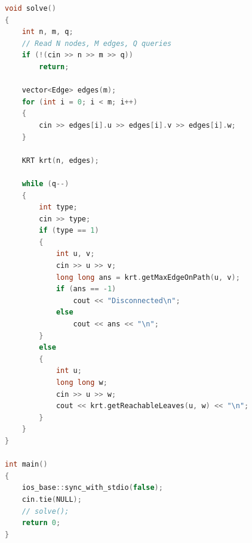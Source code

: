 \documentclass[10pt,landscape,a4paper,twocolumn]{article}
\begin{document}
\begin{lstlisting}[language=C++]
void solve()
{
    int n, m, q;
    // Read N nodes, M edges, Q queries
    if (!(cin >> n >> m >> q))
        return;

    vector<Edge> edges(m);
    for (int i = 0; i < m; i++)
    {
        cin >> edges[i].u >> edges[i].v >> edges[i].w;
    }

    KRT krt(n, edges);

    while (q--)
    {
        int type;
        cin >> type;
        if (type == 1)
        {
            int u, v;
            cin >> u >> v;
            long long ans = krt.getMaxEdgeOnPath(u, v);
            if (ans == -1)
                cout << "Disconnected\n";
            else
                cout << ans << "\n";
        }
        else
        {
            int u;
            long long w;
            cin >> u >> w;
            cout << krt.getReachableLeaves(u, w) << "\n";
        }
    }
}

int main()
{
    ios_base::sync_with_stdio(false);
    cin.tie(NULL);
    // solve();
    return 0;
}
\end{lstlisting}
\end{document}
